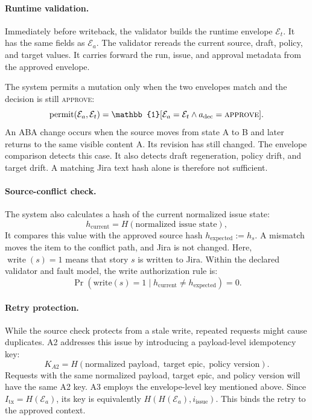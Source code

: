 \documentclass[manuscript,review]{acmart}
\begin{document}
\paragraph{Runtime validation.}
Immediately before writeback, the validator builds the runtime envelope $\mathcal{E}_t$. It has the same fields as $\mathcal{E}_a$. The validator rereads the current source, draft, policy, and target values. It carries forward the run, issue, and approval metadata from the approved envelope.

The system permits a mutation only when the two envelopes match and the decision is still \textsc{approve}:
\begin{equation}
\operatorname{permit}(\mathcal{E}_a,\mathcal{E}_t)
=\mathbb{1}[\mathcal{E}_a=\mathcal{E}_t \land a_{\mathrm{dec}}=\textsc{approve}].
\end{equation}
An ABA change occurs when the source moves from state A to B and later returns to the same visible content A. Its revision has still changed. The envelope comparison detects this case. It also detects draft regeneration, policy drift, and target drift. A matching Jira text hash alone is therefore not sufficient.

\paragraph{Source-conflict check.}
The system also calculates a hash of the current normalized issue state:
\begin{equation}
h_{\text{current}} = H(\text{normalized issue state}),
\end{equation}
It compares this value with the approved source hash $h_{\mathrm{expected}}:=h_s$. A mismatch moves the item to the conflict path, and Jira is not changed. Here, $\operatorname{write}(s)=1$ means that story $s$ is written to Jira. Within the declared validator and fault model, the write authorization rule is:
\begin{equation}
\Pr(\text{write}(s)=1 \mid h_{\text{current}}\ne h_{\text{expected}})=0.
\end{equation}

\paragraph{Retry protection.}
While the source check protects from a stale write, repeated requests might cause duplicates. A2 addresses this issue by introducing a payload-level idempotency key:
\begin{equation}
K_{A2} = H(\text{normalized payload},\;\text{target epic},\;\text{policy version}).
\end{equation}
Requests with the same normalized payload, target epic, and policy version will have the same A2 key. A3 employs the envelope-level key mentioned above. Since $I_{\mathrm{tx}}=H(\mathcal{E}_a)$, its key is equivalently $H(H(\mathcal{E}_a),i_{\mathrm{issue}})$. This binds the retry to the approved context.
\end{document}
